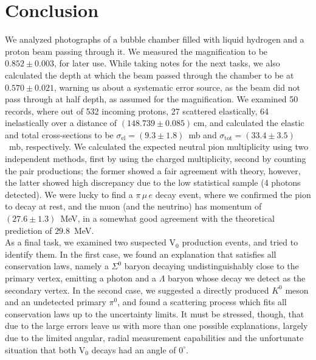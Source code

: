 \documentclass[twocolumn]{article}
\begin{document}
\section{Conclusion}
We analyzed photographs of a bubble chamber filled with liquid hydrogen and a proton beam passing through it. We measured the magnification to be $0.852 \pm 0.003$, for later use. While taking notes for the next tasks, we also calculated the depth at which the beam passed through the chamber to be at $0.570 \pm 0.021$, warning us about a systematic error source, as the beam did not pass through at half depth, as assumed for the magnification. We examined 50 records, where out of 532 incoming protons, 27 scattered elastically, 64 inelastically over a distance of $(148.739 \pm 0.085)\,$cm, and calculated the elastic and total cross-sections to be  $\sigma_{\text{el}} = (9.3 \pm 1.8)$~mb and $\sigma_{\text{tot}} = (33.4 \pm 3.5)$~mb, respectively. We calculated the expected neutral pion multiplicity using two independent methods, first by using the charged multiplicity, second by counting the pair productions; the former showed a fair agreement with theory, however, the latter showed high discrepancy due to the low statistical sample (4 photons detected). We were lucky to find a $\pi \, \mu \, e$ decay event, where we confirmed the pion to decay at rest, and the muon (and the neutrino) has momentum of $(27.6 \pm 1.3)$~MeV, in a somewhat good agreement with the theoretical prediction of $29.8$~MeV.\\
As a final task, we examined two suspected V$_0$ production events, and tried to identify them. In the first case, we found an explanation that satisfies all conservation laws, namely a $\Sigma^0$ baryon decaying undistinguishably close to the primary vertex, emitting a photon and a $\Lambda$ baryon whose decay we detect as the secondary vertex. In the second case, we suggested a directly produced $K^0$ meson and an undetected primary $\pi^0$, and found a scattering process which fits all conservation laws up to the uncertainty limits. It must be stressed, though, that due to the large errors leave us with more than one possible explanations, largely due to the limited angular, radial measurement capabilities and the unfortunate situation that both V$_0$ decays had an angle of $0^{\circ}$.
\end{document}
